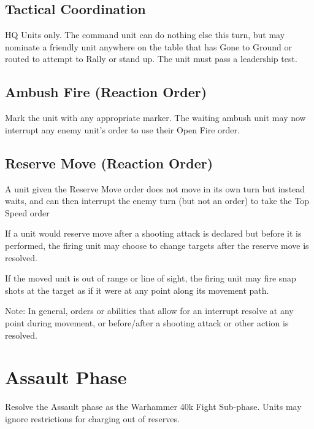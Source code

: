 \documentclass[letterpaper,twocolumn,oneside,titlepage]{book}
\begin{document}
\subsection{\texorpdfstring{\textbf{Tactical
Coordination}}{Tactical Coordination}}\label{tactical-coordination}

HQ Units only. The command unit can do nothing else this turn, but may
nominate a friendly unit anywhere on the table that has Gone to Ground
or routed to attempt to Rally or stand up. The unit must pass a
leadership test.

\subsection{\texorpdfstring{\textbf{Ambush Fire (Reaction
Order)}}{Ambush Fire (Reaction Order)}}\label{ambush-fire-reaction-order}

Mark the unit with any appropriate marker. The waiting ambush unit may
now interrupt any enemy unit's order to use their Open Fire order.

\subsection{\texorpdfstring{\textbf{Reserve Move (Reaction
Order)}}{Reserve Move (Reaction Order)}}\label{reserve-move-reaction-order}

A unit given the Reserve Move order does not move in its own turn but
instead waits, and can then interrupt the enemy turn (but not an order)
to take the Top Speed order

If a unit would reserve move after a shooting attack is declared but
before it is performed, the firing unit may choose to change targets
after the reserve move is resolved.

If the moved unit is out of range or line of sight, the firing unit may
fire snap shots at the target as if it were at any point along its
movement path.

Note: In general, orders or abilities that allow for an interrupt
resolve at any point during movement, or before/after a shooting attack
or other action is resolved.

\section{\texorpdfstring{\textbf{Assault
Phase}}{Assault Phase}}\label{assault-phase}

Resolve the Assault phase as the Warhammer 40k Fight Sub-phase. Units
may ignore restrictions for charging out of reserves.
\end{document}
